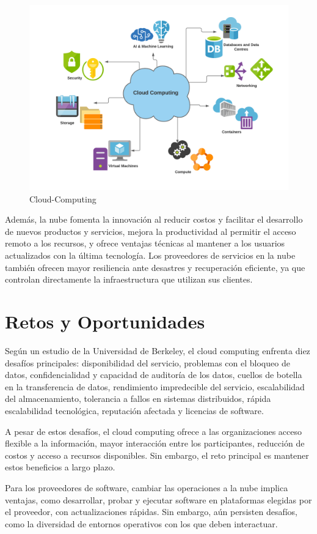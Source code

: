 \documentclass[a4paper,10pt]{article}
\begin{document}
\begin{figure}[h!]
    \centering
    \includegraphics[width=0.5\linewidth]{Cloud-Computing.png}
        \caption{Cloud-Computing}
    \label{fig:ejemplo}
\end{figure}

Además, la nube fomenta la innovación al reducir costos y facilitar el desarrollo de nuevos productos y servicios, mejora la productividad al permitir el acceso remoto a los recursos, y ofrece ventajas técnicas al mantener a los usuarios actualizados con la última tecnología. Los proveedores de servicios en la nube también ofrecen mayor resiliencia ante desastres y recuperación eficiente, ya que controlan directamente la infraestructura que utilizan sus clientes.


\section{Retos y Oportunidades}
Según un estudio de la Universidad de Berkeley, el cloud computing enfrenta diez desafíos principales: disponibilidad del servicio, problemas con el bloqueo de datos, confidencialidad y capacidad de auditoría de los datos, cuellos de botella en la transferencia de datos, rendimiento impredecible del servicio, escalabilidad del almacenamiento, tolerancia a fallos en sistemas distribuidos, rápida escalabilidad tecnológica, reputación afectada y licencias de software.

A pesar de estos desafíos, el cloud computing ofrece a las organizaciones acceso flexible a la información, mayor interacción entre los participantes, reducción de costos y acceso a recursos disponibles. Sin embargo, el reto principal es mantener estos beneficios a largo plazo.

Para los proveedores de software, cambiar las operaciones a la nube implica ventajas, como desarrollar, probar y ejecutar software en plataformas elegidas por el proveedor, con actualizaciones rápidas. Sin embargo, aún persisten desafíos, como la diversidad de entornos operativos con los que deben interactuar.
\end{document}
